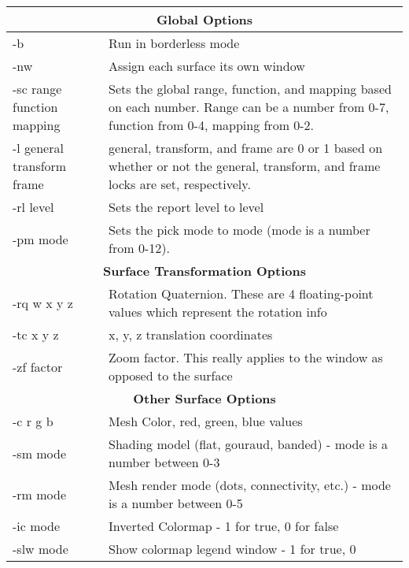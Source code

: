 \begin{table}[htbp]
\begin{center}
\begin{tabular}{|l|p{4in}|} \hline
        \multicolumn{2}{|c||}{\textbf{Global Options}} \\ \hline
        -b              &       Run \map{} in borderless mode \\
        -nw             &       Assign each surface its own window \\ \hline
        -sc range function mapping   &   Sets the global range, function,
        and mapping based on each number. 
                                         Range can be a number from 0-7,
        function from 0-4, mapping from 0-2. \\ \hline 
        -l general transform frame   &   general, transform, and frame are
        0 or 1 based on whether or not 
                                         the general, transform, and frame
        locks are set, respectively. \\ \hline 
        -rl level       &       Sets the report level to level \\ \hline
        -pm mode        &       Sets the pick mode to mode (mode is a
        number from 0-12). \\ \hline 
        \multicolumn{2}{|c||}{\textbf{Surface Transformation Options}} \\ \hline
        -rq w x y z     &       Rotation Quaternion.  These are 4
        floating-point values which represent the rotation info \\ 
        -tc x y z       &       x, y, z translation coordinates \\ \hline
        -zf factor      &       Zoom factor.  This really applies to the
        window as opposed to the surface\\ \hline 
        \multicolumn{2}{|c||}{\textbf{Other Surface Options}} \\ \hline
        -c r g b        &       Mesh Color, red, green, blue values \\
        -sm mode        &       Shading model (flat, gouraud, banded) -
        mode is a number between 0-3 \\ 
        -rm mode        &       Mesh render mode (dots, connectivity, etc.)
        - mode is a number between 0-5 \\ 
        -ic mode        &       Inverted Colormap - 1 for true, 0 for false\\
        -slw mode       &       Show colormap legend window - 1 for true, 0

\end{tabular}
\end{center}
\end{table}
